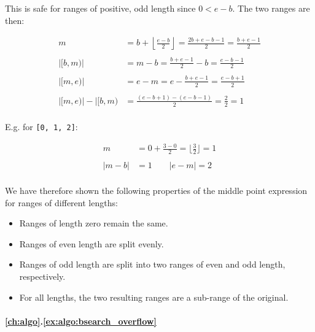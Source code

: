 This is safe for ranges of positive, odd length since $0 < e - b$.  The two
ranges are then:

\begin{align*}
                     m &= b + \left\lfloor \frac{e - b}{2} \right\rfloor
                        = \frac{2b + e - b - 1}{2}
                        = \frac{b + e - 1}{2} \\\\
              |[b, m)| &= m - b
                        = \frac{b + e - 1}{2} - b
                        = \frac{e - b - 1}{2} \\\\
              |[m, e)| &= e - m
                        = e - \frac{b + e - 1}{2}
                        = \frac{e - b + 1}{2} \\\\
    |[m, e)| - |[b, m) &= \frac{(e - b + 1) - (e - b - 1)}{2}
                        = \frac{2}{2}
                        = 1 \\
\end{align*}

E.g. for \texttt{[0, 1, 2]}:

\begin{align*}
          m &= 0 + \frac{3 - 0}{2}
             = \bigg \lfloor \frac{3}{2} \bigg \rfloor
             = 1 \\\\
    |m - b| &= 1 \qquad |e - m|
             = 2 \\
\end{align*}

We have therefore shown the following properties of the middle point expression
for ranges of different lengths:

\begin{itemize}
    \item Ranges of length zero remain the same.
    \item Ranges of even length are split evenly.
    \item
        Ranges of odd length are split into two ranges of even and odd length,
        respectively.
    \item
        For all lengths, the two resulting ranges are a sub-range of the
        original.
\end{itemize}

\paragraph{\ref{ch:algo}.\ref{ex:algo:bsearch_overflow}}

